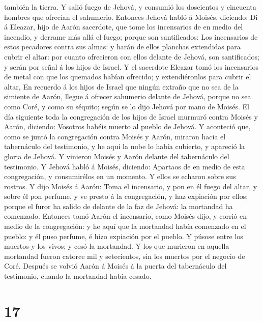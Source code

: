 también la tierra.  Y salió fuego de Jehová, y consumió
los doscientos y cincuenta hombres que ofrecían el sahumerio.
 Entonces Jehová habló á Moisés, diciendo:
 Di á Eleazar, hijo de Aarón sacerdote, que tome los
incensarios de en medio del incendio, y derrame más allá el fuego;
porque son santificados:  Los incensarios de estos
pecadores contra sus almas: y harán de ellos planchas extendidas para
cubrir el altar: por cuanto ofrecieron con ellos delante de Jehová, son
santificados; y serán por señal á los hijos de Israel.  Y
el sacerdote Eleazar tomó los incensarios de metal con que los quemados
habían ofrecido; y extendiéronlos para cubrir el altar, 
En recuerdo á los hijos de Israel que ningún extraño que no sea de la
simiente de Aarón, llegue á ofrecer sahumerio delante de Jehová, porque
no sea como Coré, y como su séquito; según se lo dijo Jehová por mano de
Moisés.  El día siguiente toda la congregación de los
hijos de Israel murmuró contra Moisés y Aarón, diciendo: Vosotros habéis
muerto al pueblo de Jehová.  Y aconteció que, como se
juntó la congregación contra Moisés y Aarón, miraron hacia el
tabernáculo del testimonio, y he aquí la nube lo había cubierto, y
apareció la gloria de Jehová.  Y vinieron Moisés y Aarón
delante del tabernáculo del testimonio.  Y Jehová habló á
Moisés, diciendo:  Apartaos de en medio de esta
congregación, y consumirélos en un momento. Y ellos se echaron sobre sus
rostros.  Y dijo Moisés á Aarón: Toma el incensario, y
pon en él fuego del altar, y sobre él pon perfume, y ve presto á la
congregación, y haz expiación por ellos; porque el furor ha salido de
delante de la faz de Jehová: la mortandad ha comenzado. 
Entonces tomó Aarón el incensario, como Moisés dijo, y corrió en medio
de la congregación: y he aquí que la mortandad había comenzado en el
pueblo: y él puso perfume, é hizo expiación por el pueblo.
 Y púsose entre los muertos y los vivos; y cesó la
mortandad.  Y los que murieron en aquella mortandad
fueron catorce mil y setecientos, sin los muertos por el negocio de
Coré.  Después se volvió Aarón á Moisés á la puerta del
tabernáculo del testimonio, cuando la mortandad había cesado.

\hypertarget{section-16}{%
\section{17}\label{section-16}}

